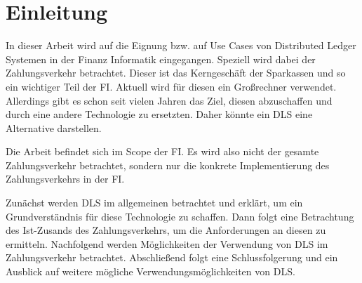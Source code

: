 
\noindent %

\section{Einleitung}

In dieser Arbeit wird auf die Eignung bzw. auf Use Cases von Distributed Ledger Systemen in der Finanz Informatik eingegangen.
Speziell wird dabei der Zahlungsverkehr betrachtet.
Dieser ist das Kerngeschäft der Sparkassen und so ein wichtiger Teil der FI.
Aktuell wird für diesen ein Großrechner verwendet.
Allerdings gibt es schon seit vielen Jahren das Ziel, diesen abzuschaffen und durch eine andere Technologie zu ersetzten.
Daher könnte ein DLS eine Alternative darstellen.

\noindent
Die Arbeit befindet sich im Scope der FI.
Es wird also nicht der gesamte Zahlungsverkehr betrachtet, sondern nur die konkrete Implementierung des Zahlungsverkehrs in der FI.

\noindent
Zunächst werden DLS im allgemeinen betrachtet und erklärt, um ein Grundverständnis für diese Technologie zu schaffen.
Dann folgt eine Betrachtung des Ist-Zusands des Zahlungsverkehrs, um die Anforderungen an diesen zu ermitteln.
Nachfolgend werden Möglichkeiten der Verwendung von DLS im Zahlungsverkehr betrachtet.
Abschließend folgt eine Schlussfolgerung und ein Ausblick auf weitere mögliche Verwendungsmöglichkeiten von DLS.